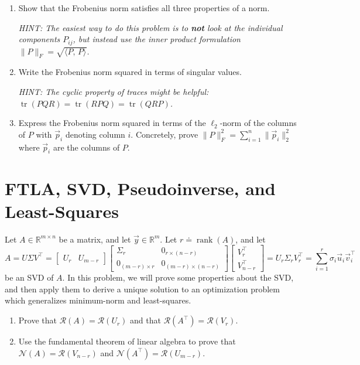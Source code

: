 \documentclass[10pt]{article}
\theoremstyle{definition}
\theoremstyle{plain}
\newcommand{\RR}{\mathbb{R}}
\newcommand{\NN}{\mathcal{N}}
\newcommand{\Range}{\mathcal{R}}
\DeclareMathOperator{\rank}{rank}
\DeclareMathOperator{\trace}{tr}
\begin{document}
\begin{enumerate}[label=(\alph*)]
\item Show that the Frobenius norm satisfies all three properties of a norm.

\textit{HINT: The easiest way to do this problem is to \textbf{not} look at the individual components $P_{ij}$, but instead use the inner product formulation $\|P\|_F = \sqrt{\langle P,\, P \rangle}$.}

\item Write the Frobenius norm squared in terms of singular values.

\textit{HINT: The cyclic property of traces might be helpful: $\trace(PQR) = \trace(RPQ) = \trace(QRP)$.}

\item Express the Frobenius norm squared in terms of the $\ell_2$-norm of the columns of $P$ with $\vec{p}_i$ denoting column $i$. Concretely, prove $\|P\|_F^2 = \sum_{i=1}^{n} \|\vec{p}_i\|_2^2$ where $\vec{p}_i$ are the columns of $P$.
\end{enumerate}

\newpage

\section{FTLA, SVD, Pseudoinverse, and Least-Squares}

Let $A \in \RR^{m \times n}$ be a matrix, and let $\vec{y} \in \RR^m$. Let $r \doteq \rank(A)$, and let
\begin{equation}
A = U\Sigma V^\top = \begin{bmatrix} U_r & U_{m-r} \end{bmatrix}
\begin{bmatrix} \Sigma_r & 0_{r \times (n-r)} \\ 0_{(m-r) \times r} & 0_{(m-r) \times (n-r)} \end{bmatrix}
\begin{bmatrix} V_r^\top \\ V_{n-r}^\top \end{bmatrix}
= U_r \Sigma_r V_r^\top = \sum_{i=1}^{r} \sigma_i \vec{u}_i \vec{v}_i^\top
\end{equation}
be an SVD of $A$. In this problem, we will prove some properties about the SVD, and then apply them to derive a unique solution to an optimization problem which generalizes minimum-norm and least-squares.

\begin{enumerate}[label=(\alph*)]
\item Prove that $\Range(A) = \Range(U_r)$ and that $\Range\!\left(A^\top\right) = \Range(V_r)$.

\item Use the fundamental theorem of linear algebra to prove that $\NN(A) = \Range(V_{n-r})$ and $\NN\!\left(A^\top\right) = \Range(U_{m-r})$.
\end{enumerate}
\end{document}
